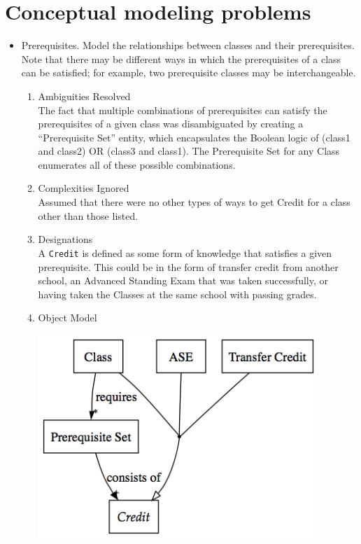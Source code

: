 \documentclass[11pt,letterpaper]{article}
\begin{document}
\section{Conceptual modeling problems}
\begin{itemize}
\item Prerequisites. Model the relationships between classes and their prerequisites. Note that there may be different ways in which the prerequisites of a class can be satisfied; for example, two prerequisite classes may be interchangeable.\\

\begin{enumerate}
\item Ambiguities Resolved\\
The fact that multiple combinations of prerequisites can satisfy the prerequisites of a given class was disambiguated by creating a ``Prerequisite Set'' entity, which encapsulates the Boolean logic of (class1 and class2) OR (class3 and class1). The Prerequisite Set for any Class enumerates all of these possible combinations.

\item Complexities Ignored\\
Assumed that there were no other types of ways to get Credit for a class other than those listed.

\item Designations\\
A \texttt{Credit} is defined as some form of knowledge that satisfies a given prerequisite. This could be in the form of transfer credit from another school, an Advanced Standing Exam that was taken successfully, or having taken the Classes at the same school with passing grades.


\item Object Model\\
\begin{center}
\includegraphics[width=300pt]{dot/b1.png}
\label{fig:ob1} 
\end{center}
\end{enumerate}


\end{itemize}
\end{document}
